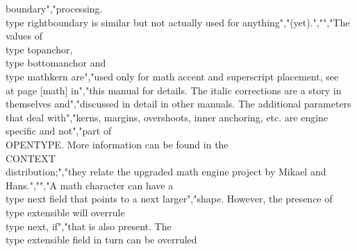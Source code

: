 boundary","processing. \\type {rightboundary} is similar but not actually used for anything","(yet).","","The values of \\type {topanchor}, \\type {bottomanchor} and \\type {mathkern} are","used only for math accent and superscript placement, see \\at {page} [math] in","this manual for details. The italic corrections are a story in themselves and","discussed in detail in other manuals. The additional parameters that deal with","kerns, margins, overshoots, inner anchoring, etc. are engine specific and not","part of \\OPENTYPE. More information can be found in the \\CONTEXT\\ distribution;","they relate the upgraded math engine project by Mikael and Hans.","","A math character can have a \\type {next} field that points to a next larger","shape. However, the presence of \\type {extensible} will overrule \\type {next}, if","that is also present. The \\type {extensible} field in turn can be overruled 